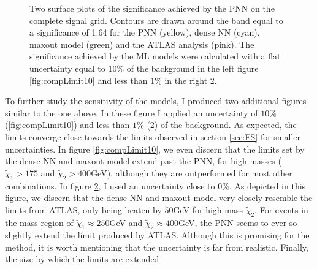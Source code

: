 \begin{figure}
{\begin{subfigure}{.6\textwidth}
        \vspace*{-48.7ex}  %
        \begin{center}
        \footnotesize
        \hspace{-42ex}
        \cite{atlas_search_2021}
        \end{center}
        \vspace*{43ex}
        \vspace{-1.cm}
        \caption{}
        \label{fig:compLimit1}
    \end{subfigure}
    }
    \caption[Two surface plots of the significance comparing sensitivity limits set by \acs{PNN}, dense \acs{NN}, maxout model
    and the \acs{ATLAS} analysis, where the models have assumed a flat uncertainty of $10\%$ and $<1\%$ respectively.]{Two surface plots 
    of the significance achieved by the \acs{PNN} on the complete signal grid. Contours are drawn around the band equal to a 
    significance of 1.64 for the \acs{PNN} (yellow), dense \acs{NN} (cyan), maxout model (green) and the \acs{ATLAS} analysis \cite{atlas_search_2021} (pink). The 
    significance achieved by the \acs{ML} models were calculated with a flat uncertainty equal to $10\%$ of the background in the left 
    figure \ref{fig:compLimit10} and less than $1\%$ in the right \ref{fig:compLimit1}.}
\end{figure}
To further study the sensitivity of the models, I produced two additional figures similar to the one above. In these figure I applied an uncertainty of 
$10\%$ (\ref{fig:compLimit10}) and less than $1\%$ (\ref{fig:compLimit1}) of the background. As expected, the limits converge close towards the limits 
observed in section \ref{sec:FS} for smaller uncertainties. In figure \ref{fig:compLimit10}, we even discern that the limits set by the dense \acs{NN}
and maxout model extend past the \ac{PNN}, for high masses ($\tilde{\chi}_1>175$ and $\tilde{\chi}_2>400$GeV), although they are outperformed for most other combinations.
In figure \ref{fig:compLimit1}, I used an uncertainty close to $0\%$. As depicted in this figure, we discern that the dense \ac{NN} and maxout model 
very closely resemble the limits from \ac{ATLAS}, only being beaten by $50$GeV for high mass $\tilde{\chi}_2$. For events in the mass region of
$\tilde{\chi}_1\approx250$GeV and $\tilde{\chi}_2\approx400$GeV, the \ac{PNN} seems to ever so slightly extend the limit produced by \ac{ATLAS}.
Although this is promising for the method, it is worth mentioning that the uncertainty is far from realistic. Finally, the size by which the limits are extended
